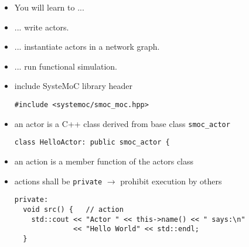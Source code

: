 \begin{frame}
\begin{itemize}
\item You will learn to ...
\item ... write actors.
\item ... instantiate actors in a network graph.
\item ... run functional simulation.
\end{itemize}
\end{frame}




\begin{frame}[fragile=singleslide]
\begin{itemize}
\item include SysteMoC library header
\begin{lstlisting}
#include <systemoc/smoc_moc.hpp>
\end{lstlisting}
\item an actor is a C++ class derived from base class \lstinline!smoc_actor!
\begin{lstlisting}
class HelloActor: public smoc_actor {
\end{lstlisting}
\item an action is a member function of the actors class
\item actions shall be \lstinline!private! $\rightarrow$ prohibit execution by others
\begin{lstlisting}
private:
  void src() {   // action
    std::cout << "Actor " << this->name() << " says:\n"
              << "Hello World" << std::endl;
  }
\end{lstlisting}
\end{itemize}
\end{frame}





